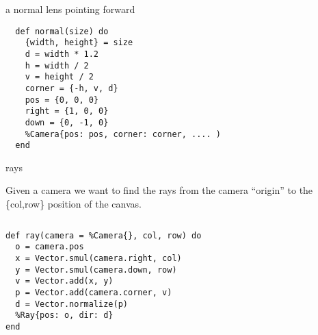 \begin{frame}[fragile]{a normal lens pointing forward}

\begin{verbatim}
  def normal(size) do
    {width, height} = size
    d = width * 1.2
    h = width / 2
    v = height / 2
    corner = {-h, v, d}
    pos = {0, 0, 0}
    right = {1, 0, 0}
    down = {0, -1, 0}
    %Camera{pos: pos, corner: corner, .... )
  end
\end{verbatim}

\end{frame}


\begin{frame}[fragile]{rays}

Given a camera we want to find the rays from the camera ``origin'' to
the \{col,row\} position of the canvas.


\begin{columns}
 \begin{column}{0.5\linewidth}
\begin{verbatim}
def ray(camera = %Camera{}, col, row) do
  o = camera.pos
  x = Vector.smul(camera.right, col)
  y = Vector.smul(camera.down, row)
  v = Vector.add(x, y)
  p = Vector.add(camera.corner, v)
  d = Vector.normalize(p)
  %Ray{pos: o, dir: d}
end
\end{verbatim}
 \end{column}
 \begin{column}{0.5\linewidth}

 \end{column}
\end{columns}

\end{frame}


